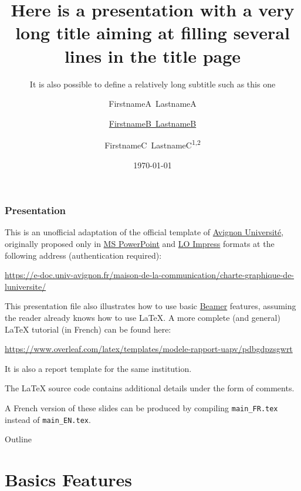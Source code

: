 \documentclass[10pt,    %
    english,            %
    xcolor=table,       %
    envcountsect,       %
    aspectratio=43      %
]{beamer}
\title[Short Title] %
    {Here is a presentation with a very long title aiming at filling several lines in the title page}
\subtitle{It is also possible to define a relatively long subtitle such as this one} %
\date[Short date] %
    {\today}
\author[Short author] %
{FirstnameA~LastnameA\inst{1} \and \underline{FirstnameB~LastnameB}\inst{2} \and FirstnameC~LastnameC\textsuperscript{1,2}}
\institute[] %
{\inst{1} Computer Science Lab, Avignon University -- LIA EA 4128 \texttt{\{firstname.lastname\}@univ-avignon.fr}
\and \inst{2} Institute of Disruptive Innovation, University of Excellence \texttt{\{firstname.lastname\}@univ-excell.fr}
}
\begin{document}
\begin{frame}
  \titlepage
\end{frame}

\begin{frame}
    \label{frm:first}
    \frametitle{Presentation} 
    
    This is an unofficial adaptation of the official template of \href{http://univ-avignon.fr/}{Avignon Université}, originally proposed only in \href{https://en.wikipedia.org/wiki/Microsoft\_PowerPoint}{MS PowerPoint} and \href{https://en.wikipedia.org/wiki/LibreOffice\#Included\_applications}{LO Impress} formats at the following address (authentication required):
    
    \url{https://e-doc.univ-avignon.fr/maison-de-la-communication/charte-graphique-de-luniversite/}
    
    \vspace{0.25cm}
    This presentation file also illustrates how to use basic \href{https://en.wikipedia.org/wiki/Beamer_(LaTeX)}{Beamer} features, assuming the reader already knows how to use \LaTeX{}. A more complete (and general) \LaTeX{} tutorial (in French) can be found here: 
    
    \url{https://www.overleaf.com/latex/templates/modele-rapport-uapv/pdbgdpzsgwrt}
    
    It is also a report template for the same institution.
    
    \vspace{0.25cm}
    The \LaTeX{} source code contains additional details under the form of comments.
    
    \vspace{0.25cm}
    A French version of these slides can be produced by compiling \texttt{main\_FR.tex} instead of \texttt{main\_EN.tex}.
\end{frame}

\begin{frame}{Outline}
    \tableofcontents
\end{frame}












\section{Basics Features}
\label{sec:basics}
\sectionframe
\end{document}
